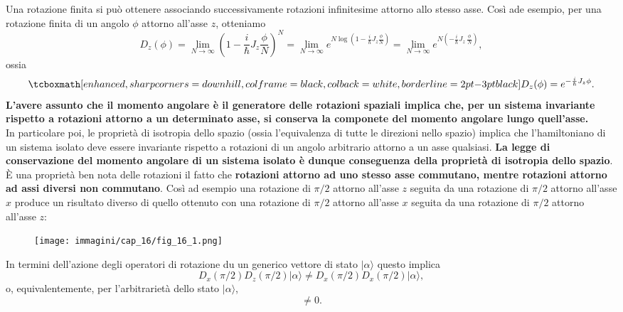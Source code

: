 \documentclass[a4paper,12pt,oneside]{book}
\begin{document}
Una rotazione finita si può ottenere associando successivamente rotazioni infinitesime attorno allo stesso asse. Così ade esempio, per una rotazione finita di un angolo $\phi$ attorno all'asse $z$, otteniamo
	\begin{equation}
		D_z (\phi) = \lim _{N\rightarrow \infty} \left(1-\frac{i}{\hbar} J_z \frac{\phi}{N}\right) ^N= \lim _{N\rightarrow \infty} e^{N\log\left(1-\frac{i}{\hbar} J_z \frac{\phi}{N}\right)}= \lim _{N\rightarrow \infty} e^{N\left(-\frac{i}{\hbar} J_z \ \frac{\phi}{N}\right)},
	\end{equation}
ossia
	\begin{equation}
		\tcboxmath[enhanced, sharp corners=downhill, colframe=black, colback=white, borderline={2pt}{-3pt}{black}]{
			D_z (\phi)=e^{-\frac{i}{\hbar} J_z \phi}.
			}
	\end{equation}
\textbf{L'avere assunto che il momento angolare è il generatore delle rotazioni spaziali implica che, per un sistema invariante rispetto a rotazioni attorno a un determinato asse, si conserva la componete del momento angolare lungo quell'asse.}\\

In particolare poi, le proprietà di isotropia dello spazio (ossia l'equivalenza di tutte le direzioni nello spazio) implica che l'hamiltoniano di un sistema isolato deve essere invariante rispetto a rotazioni di un angolo arbitrario attorno a un asse qualsiasi. \textbf{La legge di conservazione del momento angolare di un sistema isolato è dunque conseguenza della proprietà di isotropia dello spazio}.\\

È una proprietà ben nota delle rotazioni il fatto che \textbf{rotazioni attorno ad uno stesso asse commutano, mentre rotazioni attorno ad assi diversi non commutano}. Così ad esempio una rotazione di $\pi /2$ attorno all'asse $z$ seguita da una rotazione di $\pi /2$ attorno all'asse $x$ produce un risultato diverso di quello ottenuto con una rotazione di $\pi /2$ attorno all'asse $x$ seguita da una rotazione di $\pi /2$ attorno all'asse $z$:\\
\begin{figure}[!htbp]
\begin{center}
\texttt{[image: immagini/cap\_16/fig\_16\_1.png]}
\end{center}
\end{figure}


In termini dell'azione degli operatori di rotazione du un generico vettore di stato $\vert \alpha \rangle$ questo implica
	\begin{equation}
		D_x (\pi/2) D_z (\pi/2) \vert \alpha \rangle \neq D_x (\pi/2) D_x (\pi/2) \vert \alpha \rangle ,
	\end{equation}
o, equivalentemente, per l'arbitrarietà dello stato $\vert \alpha \rangle$,
\begin{equation}
[D_x (\pi/2); D_z (\pi/2)] \neq 0 .
\end{equation}\\
\end{document}

